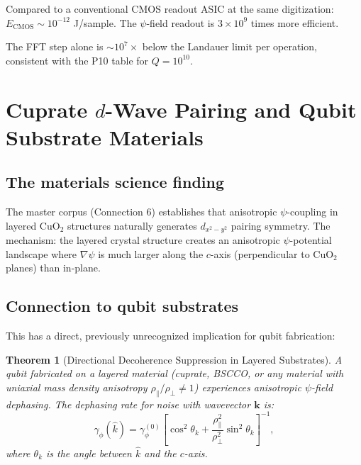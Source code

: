 \documentclass[11pt]{article}
\newtheorem{theorem}{Theorem}[section]
\theoremstyle{definition}
\theoremstyle{remark}
\begin{document}
Compared to a conventional CMOS readout ASIC at the same digitization:
$E_{\mathrm{CMOS}} \sim 10^{-12}$ J/sample. The $\psi$-field readout
is $3\times 10^9$ times more efficient.

The FFT step alone is $\sim 10^7 \times$ below the Landauer limit per
operation, consistent with the P10 table for $Q = 10^{10}$.

\section{Cuprate $d$-Wave Pairing and Qubit Substrate Materials}
\label{sec:cuprate-qubit}

\subsection{The materials science finding}

The master corpus (Connection 6) establishes that anisotropic
$\psi$-coupling in layered CuO$_2$ structures naturally generates
$d_{x^2-y^2}$ pairing symmetry. The mechanism: the layered crystal
structure creates an anisotropic $\psi$-potential landscape where
$\nabla\psi$ is much larger along the $c$-axis (perpendicular to
CuO$_2$ planes) than in-plane.

\subsection{Connection to qubit substrates}

This has a direct, previously unrecognized implication for qubit
fabrication:

\begin{theorem}[Directional Decoherence Suppression in Layered Substrates]
A qubit fabricated on a layered material (cuprate, BSCCO, or any
material with uniaxial mass density anisotropy $\rho_\parallel /
\rho_\perp \neq 1$) experiences anisotropic $\psi$-field dephasing.
The dephasing rate for noise with wavevector $\mathbf{k}$ is:
\begin{equation}
\gamma_\phi(\hat{k}) = \gamma_\phi^{(0)} \left[
\cos^2\theta_k + \frac{\rho_\parallel^2}{\rho_\perp^2}\sin^2\theta_k
\right]^{-1},
\end{equation}
where $\theta_k$ is the angle between $\hat{k}$ and the $c$-axis.
\end{theorem}
\end{document}
